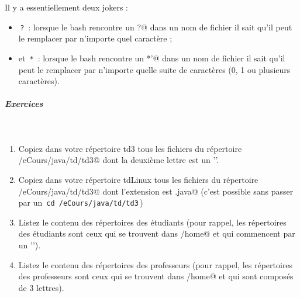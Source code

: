 \documentclass[11pt,a4paper]{article}
\begin{document}
            \par
        
          Il y a essentiellement deux jokers : 
          
					\begin{itemize}
				
			\item \,\verb|?|\, : lorsque le bash rencontre un \verb@?@ 
            dans un nom de fichier il sait qu'il peut le remplacer par n'importe quel caract\`ere ;
          
			\item 
            et \,\verb|*|\, : lorsque le bash rencontre un \verb@*'@ 
            dans un nom de fichier il sait qu'il peut le remplacer par n'importe quelle suite de caract\`eres  (0, 1 ou plusieurs caract\`eres).
          
					\end{itemize}
				
            \par
        
			
		\subparagraph{Exercices} 
		
					\textcolor{white}{.} \par
				
            \par
        
					\begin{enumerate}
				
			\item 
            Copiez dans votre r\'epertoire td3 tous les fichiers du r\'epertoire 
            \verb@/eCours/java/td/td3@ dont la deuxi\`eme lettre est un '\verb@x@'.
          
			\item 
            Copiez dans votre r\'epertoire tdLinux tous les fichiers du r\'epertoire
            \verb@/eCours/java/td/td3@ dont l'extension est \verb@.java@ 
            (c'est possible sans passer par un \,\verb|cd /eCours/java/td/td3|\,)
          
			\item 
            Listez le contenu des r\'epertoires des \'etudiants (pour rappel, les r\'epertoires des \'etudiants sont ceux 
            qui se trouvent dans \verb@/home@ et qui commencent par un '\verb@g@').
          
			\item 
            Listez le contenu des r\'epertoires des professeurs (pour rappel, les  
            r\'epertoires des professeurs sont ceux qui se trouvent dans \verb@/home@ et qui sont compos\'es de 3 lettres).
          
					\end{enumerate}
				
\end{document}
